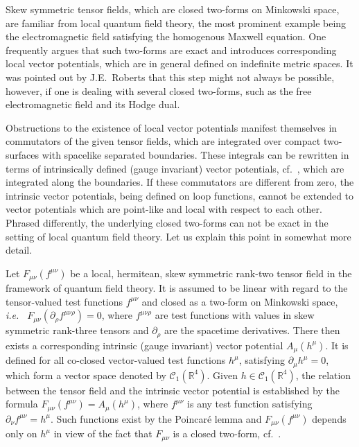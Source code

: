 \documentclass[11pt]{article}
\numberwithin{equation}{section}
\newcommand{\RR}{{\mathbb R}}
\newcommand{\Cc}{{\mathcal{C}}}
\def\ie{{\it i.e.\ }}
\begin{document}
Skew symmetric tensor fields, which are closed 
two-forms on Minkowski space, are 
familiar from local quantum field theory, the most 
prominent example being the electromagnetic field satisfying the 
homogenous Maxwell equation. One frequently argues that such  
two-forms are exact and introduces 
corresponding local vector potentials, which are in general 
defined on indefinite metric spaces. It was pointed out 
by J.E.~Roberts \cite{Roberts} that this step might not always be   
possible, however, if one is dealing with several  
closed two-forms, such as the free electromagnetic field and its 
Hodge dual.  

\medskip
Obstructions to the existence of local vector potentials manifest 
themselves in commutators of the given tensor fields, which are integrated 
over \mbox{compact} two-surfaces with spacelike separated boundaries. 
These integrals can be rewritten in terms of intrinsically defined 
(gauge invariant) vector potentials, 
cf.\ \cite{BuCiRuVa1}, which are integrated along the boundaries.
If these commutators are different from zero, the intrinsic 
vector potentials, being defined on loop functions, cannot be 
extended to vector potentials which are point-like and local 
with respect to each other. Phrased differently, the underlying closed 
two-forms can not be exact in the setting of local quantum field
theory. Let us explain this point in somewhat more detail. 

\medskip 
Let $F_{\mu \nu}(f^{\mu \nu})$ be a local, hermitean, skew symmetric 
rank-two tensor field in the framework
of quantum field theory. It is assumed to be  
linear with regard to the tensor-valued test functions $f^{\mu \nu}$ and 
closed as a two-form on Minkowski space, \ie 
$F_{\mu \nu}(\partial_\rho f^{\mu \nu \rho}) = 0$, 
where $f^{\mu \nu \rho}$ are test functions with values in skew symmetric
rank-three tensors and $\partial_\rho$ are the
spacetime derivatives. There then exists
a corresponding intrinsic (gauge invariant) vector potential $A_\mu(h^\mu)$.
It is defined for all co-closed vector-valued 
test functions $h^\mu$, satisfying 
$\partial_\mu h^\mu = 0$, which form a 
vector space denoted by $\Cc_1(\RR^4)$. 
Given $h \in \Cc_1(\RR^4)$, the relation
between the tensor field and the intrinsic vector potential 
is established by the formula
$F_{\mu \nu}(f^{\mu \nu}) = A_\mu(h^\mu)$, where 
$f^{\mu \nu}$ is any test function satisfying
\mbox{$\partial_\nu f^{\mu \nu} = h^\mu$}.
Such functions exist by the Poincar\'e lemma and $F_{\mu \nu}(f^{\mu \nu})$
depends only on $h^\mu$ in view of the fact that 
$F_{\mu \nu}$ is a closed two-form, cf.\ \cite{BuCiRuVa1}.
\end{document}
